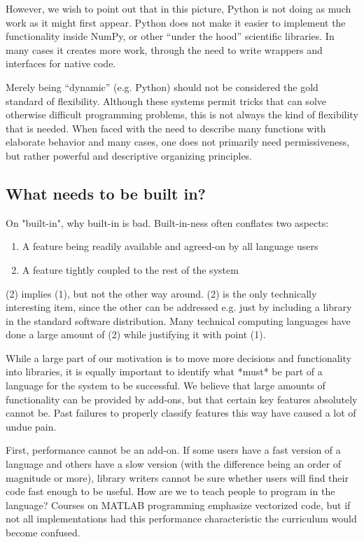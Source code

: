 {However, we wish to point out that in this picture, Python is not
doing as much work as it might first appear. Python does not make
it easier to implement the functionality inside NumPy, or other
``under the hood'' scientific libraries. In many cases it creates
more work, through the need to write wrappers and interfaces
for native code.


Merely being ``dynamic'' (e.g. Python) should not be considered
the gold standard of flexibility. Although these systems permit
tricks that can solve otherwise difficult programming problems,
this is not always the kind of flexibility that is needed.
When faced with the need to describe many functions with elaborate
behavior and many cases, one does not primarily need permissiveness,
but rather powerful and descriptive organizing principles.




\subsection{What needs to be built in?}

On "built-in", why built-in is bad. Built-in-ness often conflates two
aspects:

\begin{enumerate}
\item A feature being readily available and agreed-on by all language users
\item A feature tightly coupled to the rest of the system
\end{enumerate}

(2) implies (1), but not the other way around. (2) is the only technically
interesting item, since the other can be addressed e.g. just by including
a library in the standard software distribution. Many technical computing
languages have done a large amount of (2) while justifying it with point (1).



While a large part of our motivation is to move more decisions and functionality
into libraries, it is equally important to identify what *must* be part of a
language for the system to be successful. We believe that large amounts of
functionality can be provided by add-ons, but that certain key features
absolutely cannot be. Past failures to properly classify features this way have
caused a lot of undue pain.

First, performance cannot be an add-on. If some users have a fast version of
a language and others have a slow version (with the difference being an
order of magnitude or more), library writers cannot be sure whether users
will find their code fast enough to be useful. How are we to teach people to
program in the language? Courses on MATLAB programming emphasize vectorized code,
but if not all implementations had this performance characteristic the
curriculum would become confused.

}
